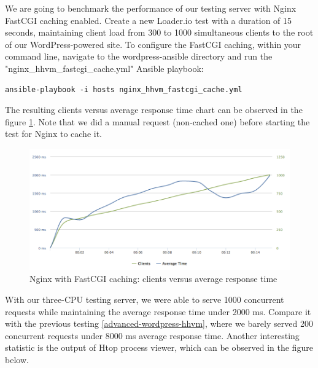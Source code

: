 We are going to benchmark the performance of our testing server with Nginx FastCGI caching enabled. Create a new Loader.io test with a duration of 15 seconds, maintaining client load from 300 to 1000 simultaneous clients to the root of our WordPress-powered site. \cite{Loader.io:nginx_hhvm_fastcgi_caching} To configure the FastCGI caching, within your command line, navigate to the wordpress-ansible directory and run the "nginx\_hhvm\_fastcgi\_cache.yml" Ansible playbook:

\begin{lstlisting}
ansible-playbook -i hosts nginx_hhvm_fastcgi_cache.yml
\end{lstlisting}

The resulting clients versus average response time chart can be observed in the figure \ref{fig:nginx_fastcgi_caching}. Note that we did a manual request (non-cached one) before starting the test for Nginx to cache it.

\begin{figure}[H]
\begin{center}
\includegraphics[scale=0.5]{figures/Nginx_FastCGI_caching.png}
\caption{Nginx with FastCGI caching: clients versus average response time}
\label{fig:nginx_fastcgi_caching}
\end{center}
\end{figure}

With our three-CPU testing server, we were able to serve 1000 concurrent requests while maintaining the average response time under 2000 ms. Compare it with the previous testing \ref{advanced-wordpress-hhvm}, where we barely served 200 concurrent requests under 8000 ms average response time. Another interesting statistic is the output of Htop process viewer, which can be observed in the figure below.

